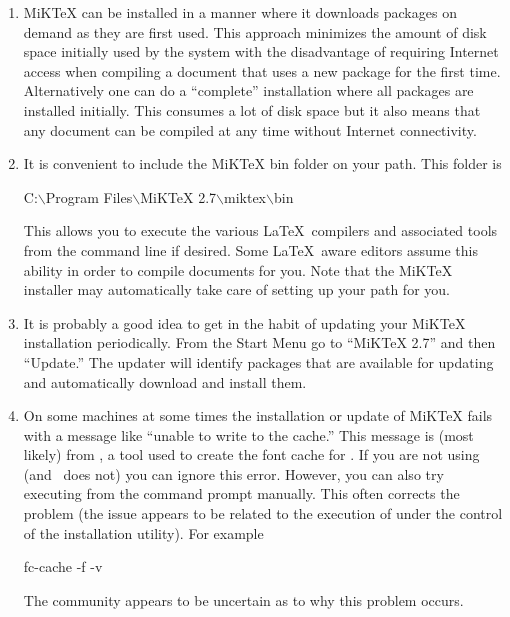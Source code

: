 \begin{enumerate}

\item MiKTeX can be installed in a manner where it downloads packages on demand as they are first used. This approach minimizes the amount of disk space initially used by the system with the disadvantage of requiring Internet access when compiling a document that uses a new package for the first time. Alternatively one can do a ``complete'' installation where all packages are installed initially. This consumes a lot of disk space but it also means that any document can be compiled at any time without Internet connectivity.

\item It is convenient to include the MiKTeX bin folder on your path. This folder is
\begin{commands}
C:$\backslash$Program Files$\backslash$MiKTeX 2.7$\backslash$miktex$\backslash$bin
\end{commands}

This allows you to execute the various \LaTeX\ compilers and associated tools from the command line if desired. Some \LaTeX\ aware editors assume this ability in order to compile documents for you. Note that the MiKTeX installer may automatically take care of setting up your path for you.

\item It is probably a good idea to get in the habit of updating your MiKTeX installation periodically. From the Start Menu go to ``MiKTeX 2.7'' and then ``Update.'' The updater will identify packages that are available for updating and automatically download and install them.

\item On some machines at some times the installation or update of MiKTeX fails with a message like ``unable to write to the cache.'' This message is (most likely) from , a tool used to create the font cache for . If you are not using  (and \VTank\ does not) you can ignore this error. However, you can also try executing  from the command prompt manually. This often corrects the problem (the issue appears to be related to the execution of  under the control of the installation utility). For example
\begin{commands}
fc-cache -f -v
\end{commands}
The community appears to be uncertain as to why this problem occurs.

\end{enumerate}

